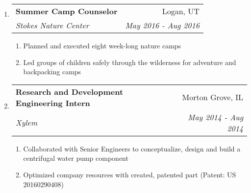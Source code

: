 \documentclass[letterpaper,10pt]{extarticle}
\makeatletter
\newcommand\tab[1][.25cm]{\hspace*{#1}} %
\newcommand{\ressubheading}[4]{
\begin{tabular*}{7.5in}{l@{\extracolsep{\fill}}r}
		\tab\textbf{#1} & #2 \\
		\tab\textit{#3} & \textit{#4} \\
\end{tabular*}\vspace{-6pt}}
\newcommand{\resitem}[1]{\item #1 \vspace{-2pt}}
\makeatother
\begin{document}
\begin{enumerate}
\begin{comment}
\item[]
	\ressubheading{Mathematics and Physics Tutor}{Petersboro, UT}{Avalon Hills Foundation for Eating Disorders}{May 2015 - April 2017}
	\begin{enumerate}
		\resitem[--]{Tailor strategies and lesson plans to provide educational support and improve student study skills}
	\end{enumerate}
	\end{comment}
\item[]
	\ressubheading{Summer Camp Counselor}{Logan, UT}{Stokes Nature Center}{May 2016 - Aug 2016}
	\begin{enumerate}
	\setlength\itemsep{-.25em}
		\resitem[--]{Planned and executed eight week-long nature camps}
		\resitem[--]{Led groups of children safely through the wilderness for adventure and backpacking camps}
	\end{enumerate}
	
\begin{comment}	
\item[]
	\ressubheading{Utah State University}{Logan, UT}{Intensive English Language Institute (IELI) Teacher's Assistant}{Aug 2014 - May 2015}
	\begin{enumerate}
	\setlength\itemsep{-.25em}
		\resitem[--]{Instructed a classroom of international students in the English Language}
		\resitem[--]{Worked in tandem with supervising instructor to lead diverse, conversational groups to improve language skills}
	\end{enumerate}
\end{comment}		
	
	
\item[]
	\ressubheading{Research and Development Engineering Intern}{Morton Grove, IL}{Xylem}{May 2014 - Aug 2014}
	\begin{enumerate}
		\setlength\itemsep{-.25em}
		\resitem[--]{Collaborated with Senior Engineers to conceptualize, design and build a centrifugal water pump component}
		\resitem[--]{Optimized company resources with created, patented part (Patent: US 20160290408)}
		
		
	\end{enumerate}


	
\begin{comment}
\item[]
	\ressubheading{General Electric Healthcare Life Sciences}{Logan, UT}{Media Biomanufacturing Production Technician}{Jun 2015 - Jan 2016}
	\begin{enumerate}
		\resitem[--]{Maintained cleanroom procedures to produce media for cell growth while maintaining hydraulic pressure, conductivity, pH, osmolarity, etc.}
	\end{enumerate}
	\end{comment}


\end{enumerate}
\end{document}
